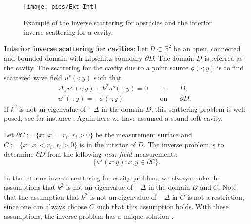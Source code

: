 \documentclass[final]{siamltex}
\begin{document}
\vspace{.5\baselineskip}


    \begin{figure}[ht!]
    \centering
\texttt{[image: pics/Ext\_Int]}
     \caption{
     \linespread{1}
Example of the inverse scattering for obstacles and the interior inverse scattering for a cavity.
     } \label{fig geometry}
    \end{figure}

\noindent \textbf{Interior inverse scattering for cavities}:  Let $D\subset \mathbb{R}^2$ be an open, connected and bounded domain with Lipschitz boundary $\partial D$. The domain $D$ is referred as the cavity. The scattering for the cavity due to a point source $\phi(\cdot;y)$ is to find scattered wave field $u^s(\cdot;y)$ such that
\begin{eqnarray}
\Delta_x u^s(\cdot;y) + k^2 u^s(\cdot;y) = 0 \quad &\mbox{in}& \quad D, \quad  \label{cavity us eqn1}\\
u^s(\cdot;y) = -\phi(\cdot;y) \quad &\mbox{on}& \quad \partial D   \label{cavity us eqn2}.
\end{eqnarray}
If $k^2$ is not an eigenvalue of $-\Delta$ in the domain $D$, this scattering problem is well-posed, see for instance \cite{L,QCo2}. Again here we have assumed a sound-soft cavity.

Let $\partial C:=\{x: |x|=r_i, \,r_i>0\}$ be the measurement surface and $C:=\{x: |x|<r_i, \,r_i>0\}$ is in the interior of $D$. The inverse problem is to determine $\partial D$ from the following \textit{near field} measurements:
\begin{equation} \label{cavity nfm}
\{ u^s(x;y): x,y \in \partial C\}.
\end{equation}



In the interior inverse scattering for cavity problem, we always make the assumptions that $k^2$ is not an eigenvalue of $-\Delta$ in the domain $D$ and $C$. Note that  the assumption that $k^2$ is not an eigenvalue of $-\Delta$ in $C$ is not a restriction, since one can always choose $C$ such that this assumption holds. With these assumptions, the inverse problem has a unique solution \cite{L,QCo2}.

%
%
\end{document}
